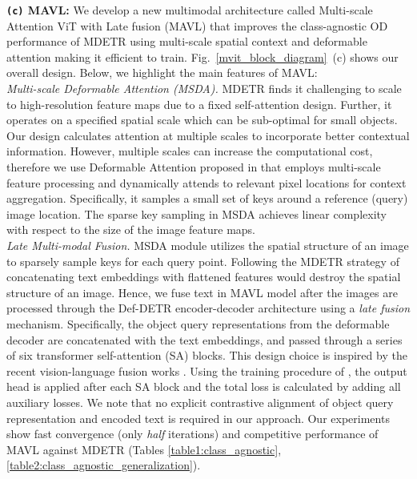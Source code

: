 \documentclass[runningheads]{llncs}
\newcommand{\txt}[1]{{\texttt{#1}}}
\begin{document}
\noindent \textbf{\txt{(c)} MAVL:}  We develop a new multimodal architecture called Multi-scale Attention ViT with Late fusion (MAVL) that improves the class-agnostic OD performance of MDETR {using multi-scale spatial context and deformable attention} making it efficient to train. Fig.~\ref{mvit_block_diagram}~(c) shows our overall design. Below, we highlight the main features of MAVL: \\
\noindent
\textit{Multi-scale Deformable Attention (MSDA).} MDETR \cite{mdetr} finds it challenging to scale to high-resolution feature maps due to a fixed self-attention design. 
Further, it operates on a specified spatial scale which can be sub-optimal for small objects. Our design calculates attention at multiple scales to incorporate better contextual information. However, multiple scales can increase the computational cost, therefore we use Deformable Attention proposed in \cite{zhu2020deformable} that employs multi-scale feature processing and dynamically attends to relevant pixel locations for context aggregation. Specifically, it samples a small set of keys around a reference (query) image location. The sparse key sampling in MSDA achieves linear complexity with respect to the size of the image feature maps.\\
\noindent
\textit{Late Multi-modal Fusion.} MSDA module
utilizes the spatial structure of an image to sparsely sample keys for each query point. Following the MDETR strategy of concatenating text embeddings with flattened 
features would destroy the spatial structure of an image. Hence, we fuse text in MAVL model after the images are processed through the Def-DETR encoder-decoder architecture using a \emph{late fusion} mechanism. Specifically, the object query representations from the deformable decoder are concatenated with the text embeddings, and passed through a series of {six} transformer self-attention (SA) blocks. This design choice is inspired by the recent vision-language fusion works \cite{ViLBERT,VL-BERT,LXMERT,sun2019videobert}. Using the training procedure of \cite{DETR}, the output head is applied after each SA block and the total loss is calculated by adding all auxiliary losses. We note that no explicit contrastive alignment of object query representation and encoded text is required in our approach. Our experiments show fast convergence (only \emph{half} iterations) and competitive performance of MAVL against MDETR (Tables \ref{table1:class_agnostic}, \ref{table2:class_agnostic_generalization}).
\end{document}
